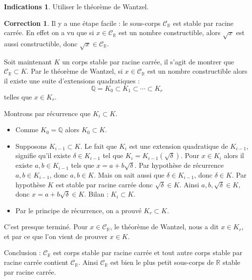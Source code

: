 \documentclass[11pt,a4paper]{article}
\newcommand{\Qq}{\mathbb{Q}} \newcommand{\Q}{\mathbb{Q}}
\newcommand{\Rr}{\mathbb{R}} \newcommand{\R}{\mathbb{R}}
\theoremstyle{definition}
\newtheorem{ind}{Indications}
\newtheorem{cor}{Correction}
\newcommand{\indication}{\begin{ind}} \newcommand{\finindication}{\end{ind}}
\newcommand{\correction}{\begin{cor}} \newcommand{\fincorrection}{\end{cor}}
\begin{document}
\indication
Utiliser le théorème de Wantzel.
\finindication

\correction
Il y a une étape facile : le sous-corps $\mathcal{C}_\Rr$ est stable par racine carrée.
En effet on a vu que si $x \in \mathcal{C}_\Rr$ est un nombre constructible, alors
$\sqrt x$ est aussi constructible, donc $\sqrt x \in \mathcal{C}_\Rr$.

\bigskip

Soit maintenant $K$ un corps stable par racine carrée, il s'agit de montrer que
$\mathcal{C}_\Rr \subset K$.
Par le théorème de Wantzel, si $x \in \mathcal{C}_\Rr$ est un nombre constructible alors
il existe une suite d'extensions quadratiques :
$$\Qq = K_0 \subset K_1 \subset \cdots \subset K_r$$
telles que $x \in K_r$.

\bigskip

Montrons par récurrence que $K_i \subset K$.
\begin{itemize}
  \item Comme $K_0 = \Qq$ alors $K_0 \subset K$.
  
  \item Supposons $K_{i-1} \subset K$. Le fait que $K_i$ est une extension quadratique de 
  $K_{i-1}$, signifie qu'il existe $\delta \in K_{i-1}$ tel que  $K_i = K_{i-1}(\sqrt{\delta})$.
  Pour $x \in K_i$ alors il existe $a,b \in K_{i-1}$ tels que $x = a + b \sqrt{\delta}$.
  Par hypothèse de récurrence $a,b \in K_{i-1}$, donc $a,b \in K$.
  Mais on sait aussi que $\delta \in K_{i-1}$, donc $\delta \in K$. Par hypothèse
  $K$ est stable par racine carrée donc $\sqrt\delta \in K$.
  Ainsi $a,b, \sqrt\delta \in K$, donc $x  = a + b \sqrt{\delta} \in K$.
  Bilan : $K_i \subset K$.
  
  \item Par le principe de récurrence, on a prouvé $K_r \subset K$.
\end{itemize}

\bigskip


C'est presque terminé. Pour $x \in \mathcal{C}_\Rr$, le théorème de Wantzel, nous a
dit $x \in K_r$, et par ce que l'on vient de prouver $x \in K$.

\bigskip

Conclusion : $\mathcal{C}_\Rr$ est corps stable par racine carrée et tout autre corps
stable par racine carrée contient $\mathcal{C}_\Rr$.
Ainsi $\mathcal{C}_\Rr$ est bien  
le plus petit sous-corps de $\Rr$ stable par racine carrée.
\fincorrection

\finexercice
\end{document}
